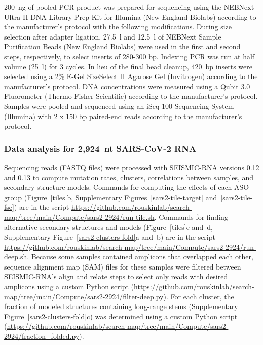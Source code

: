 \documentclass[main.tex]{subfiles}
\begin{document}
200~ng of pooled PCR product was prepared for sequencing using the NEBNext Ultra II DNA Library Prep Kit for Illumina (New England Biolabs) according to the manufacturer's protocol with the following modifications.
During size selection after adapter ligation, 27.5~\textmu l and 12.5~\textmu l of NEBNext Sample Purification Beads (New England Biolabs) were used in the first and second steps, respectively, to select inserts of 280-300 bp.
Indexing PCR was run at half volume (25~\textmu l) for 3 cycles.
In lieu of the final bead cleanup, 420~bp inserts were selected using a 2\% E-Gel SizeSelect II Agarose Gel (Invitrogen) according to the manufacturer's protocol.
DNA concentrations were measured using a Qubit 3.0 Fluorometer (Thermo Fisher Scientific) according to the manufacturer's protocol.
Samples were pooled and sequenced using an iSeq 100 Sequencing System (Illumina) with 2 x 150 bp paired-end reads according to the manufacturer's protocol.

\subsubsection{Data analysis for 2,924~nt SARS-CoV-2 RNA}

Sequencing reads (FASTQ files) were processed with SEISMIC-RNA versions 0.12 and 0.13 to compute mutation rates, clusters, correlations between samples, and secondary structure models.
Commands for computing the effects of each ASO group (Figure~\ref{tiles}b, Supplementary Figures~\ref{sars2-tile-target} and~\ref{sars2-tile-fse}) are in the script \url{https://github.com/rouskinlab/search-map/tree/main/Compute/sars2-2924/run-tile.sh}.
Commands for finding alternative secondary structures and models (Figure~\ref{tiles}c and~d, Supplementary Figure~\ref{sars2-clusters-fold}a and~b) are in the script \url{https://github.com/rouskinlab/search-map/tree/main/Compute/sars2-2924/run-deep.sh}.
Because some samples contained amplicons that overlapped each other, sequence alignment map (SAM) files for these samples were filtered between SEISMIC-RNA's align and relate steps to select only reads with desired amplicons using a custom Python script (\url{https://github.com/rouskinlab/search-map/tree/main/Compute/sars2-2924/filter-deep.py}).
For each cluster, the fraction of modeled structures containing long-range stems (Supplementary Figure~\ref{sars2-clusters-fold}c) was determined using a custom Python script (\url{https://github.com/rouskinlab/search-map/tree/main/Compute/sars2-2924/fraction_folded.py}).
\end{document}
